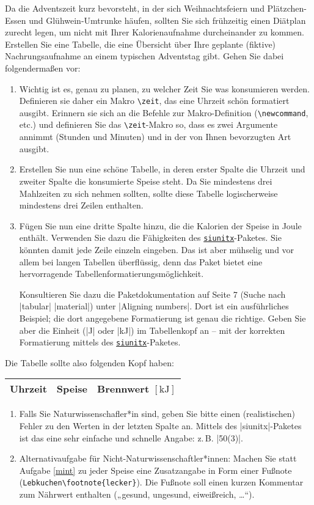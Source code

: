 \documentclass{scrartcl}
\newcommand{\pkg}[1]{\href{http://ctan.org/pkg/#1}{\texttt{#1}}}
\begin{document}
\begin{question}[subtitle=Adventskalorien]{12}
	Da die Adventszeit kurz bevorsteht, in der sich Weihnachtsfeiern und Plätzchen-Essen und Glühwein-Umtrunke häufen, sollten Sie sich frühzeitig einen Diätplan zurecht legen, um nicht mit Ihrer Kalorienaufnahme durcheinander zu kommen. Erstellen Sie eine Tabelle, die eine Übersicht über Ihre geplante (fiktive) Nachrungsaufnahme an einem typischen Adventstag gibt. Gehen Sie dabei folgendermaßen vor:
	\begin{enumerate}[label=\alph*)]
		\item Wichtig ist es, genau zu planen, zu welcher Zeit Sie was konsumieren werden. Definieren sie daher ein Makro \texttt{\textbackslash zeit}, das eine Uhrzeit schön formatiert ausgibt. Erinnern sie sich an die Befehle zur Makro-Definition (\texttt{\textbackslash newcommand}, etc.) und definieren Sie das \texttt{\textbackslash zeit}-Makro so, dass es zwei Argumente annimmt (Stunden und Minuten) und in der von Ihnen bevorzugten Art ausgibt.
		\item Erstellen Sie nun eine schöne Tabelle, in deren erster Spalte die Uhrzeit und zweiter Spalte die konsumierte Speise steht. Da Sie mindestens drei Mahlzeiten zu sich nehmen sollten, sollte diese Tabelle logischerweise mindestens drei Zeilen enthalten.
		\item Fügen Sie nun eine dritte Spalte hinzu, die die Kalorien der Speise in Joule enthält. Verwenden Sie dazu die Fähigkeiten des \pkg{siunitx}-Paketes. Sie könnten damit jede Zeile einzeln eingeben. Das ist aber mühselig und vor allem bei langen Tabellen überflüssig, denn das Paket bietet eine hervorragende Tabellenformatierungsmöglichkeit.

Konsultieren Sie dazu die Paketdokumentation auf Seite 7 (Suche nach |tabular| |material|) unter |Aligning numbers|. Dort ist ein ausführliches Beispiel; die dort angegebene Formatierung ist genau die richtige. Geben Sie aber die Einheit (|J| oder |kJ|) im Tabellenkopf an – mit der korrekten Formatierung mittels des \pkg{siunitx}-Paketes.
	\end{enumerate}
	Die Tabelle sollte also folgenden Kopf haben:
	\begin{table}[h]
		\centering
		\begin{tabular}{lll}
			\toprule
			Uhrzeit & Speise & Brennwert $[\mathrm{kJ}]$\\
			\midrule
		\end{tabular}
	\end{table}
	\begin{enumerate}[resume, label=\alph*)]
		\item \label{mint} Falls Sie Naturwissenschafler*in sind, geben Sie bitte einen (realistischen) Fehler zu den Werten in der letzten Spalte an. Mittels des |siunitx|-Paketes ist das eine sehr einfache und schnelle Angabe: z.\,B. |50(3)|.
		\item Alternativaufgabe für Nicht-Naturwissenschaftler*innen: Machen Sie statt Aufgabe \ref{mint} zu jeder Speise eine Zusatzangabe in Form einer Fußnote (\texttt{Lebkuchen\textbackslash footnote\{lecker\}}). Die Fußnote soll einen kurzen Kommentar zum Nährwert enthalten („gesund, ungesund, eiweißreich, …“).
		

\end{enumerate}
\end{question}
\end{document}
